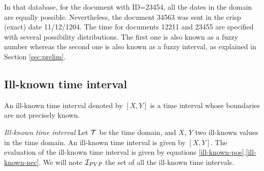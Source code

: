 In that database, for the document with ID=23454, all the dates in the domain are equally possible. Nevertheless, the document 34563 was sent in the crisp (exact) date 11/12/1204. The time for documents 12211 and 23455 are specified with several possibility distributions. The first one is also known as a fuzzy number whereas the second one is also known as a fuzzy interval, as explained in Section \ref{sec:prelim}.
 
 
 


\subsection{\label{subsec:ill-known-interval}Ill-known time interval}



An ill-known time interval denoted by $\left[X, Y\right]$ is a time interval whose boundaries are not precisely known. %

\begin{definition}
\emph{Ill-known time interval}
Let $\mathcal{T}$ be the time domain, and $X$, $Y$ two ill-known values in the time domain. An ill-known time interval is given by $\left[X, Y\right]$. The evaluation of the ill-known time interval is given by equations \eqref{ill-known-pos},\eqref{ill-known-nec}. We will note $\mathcal{I}_{PVP}$ the set of all the ill-known time intervals.

\end{definition}


